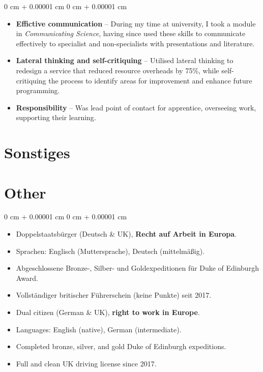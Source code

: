 \documentclass[10pt, letterpaper]{article}
\newenvironment{highlights}{
    \begin{itemize}[
        topsep=0.2 cm,
        parsep=0.2 cm,
        partopsep=0pt,
        itemsep=0.025 cm,
        leftmargin=0 cm + 10pt
    ]
}{
    \end{itemize}
}
\newenvironment{onecolentry}{
    \begin{adjustwidth}{
        0 cm + 0.00001 cm
    }{
        0 cm + 0.00001 cm
    }
}{
    \end{adjustwidth}
}
\begin{document}
\begin{onecolentry}
\begin{highlights}
                \item \textbf{Effictive communication} -- During my time at university, I took a module in \textit{Communicating Science}, having since used these skills to communicate effectively to specialist and non-specialists with presentations and literature. 
                \item \textbf{Lateral thinking and self-critiquing} -- Utilised lateral thinking to redesign a service that reduced resource overheads by 75\%, while self-critiquing the process to identify areas for improvement and enhance future programming.
                \item \textbf{Responsibility} -- Was lead point of contact for apprentice, overseeing work, supporting their learning.
                \fi
            \end{highlights}
        \end{onecolentry}

        \vspace{0.15 cm}

    \ifdefined\german
    \section{Sonstiges}
    \else
    \section{Other}
    \fi

        \begin{onecolentry}
            \begin{highlights}
                \ifdefined\german
                \item Doppelstaatsbürger (Deutsch \& UK), \textbf{Recht auf Arbeit in Europa}.
                \item Sprachen: Englisch (Muttersprache), Deutsch (mittelmäßig).
                \item Abgeschlossene Bronze-, Silber- und Goldexpeditionen für Duke of Edinburgh Award.
                \item Vollständiger britischer Führerschein (keine Punkte) seit 2017.
                \else
                \item Dual citizen (German \& UK), \textbf{right to work in Europe}.
                \item Languages: English (native), German (intermediate).
                \item Completed bronze, silver, and gold Duke of Edinburgh expeditions.
                \item Full and clean UK driving license since 2017.
                \fi
            \end{highlights}
        \end{onecolentry}
\end{document}
